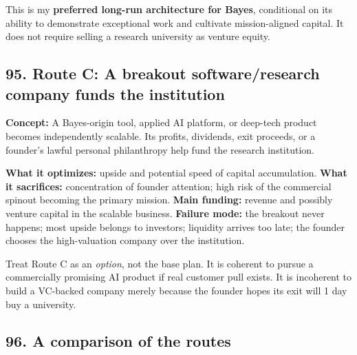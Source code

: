 This is my \textbf{preferred long-run architecture for Bayes}, conditional on its ability to demonstrate exceptional work and cultivate mission-aligned capital. It does not require selling a research university as venture equity.

\subsection{95. Route C: A breakout software/\allowbreak research company funds the institution}

\textbf{Concept:} A Bayes-origin tool, applied AI platform, or deep-tech product becomes independently scalable. Its profits, dividends, exit proceeds, or a founder's lawful personal philanthropy help fund the research institution.

\textbf{What it optimizes:} upside and potential speed of capital accumulation.
\textbf{What it sacrifices:} concentration of founder attention; high risk of the commercial spinout becoming the primary mission.
\textbf{Main funding:} revenue and possibly venture capital in the scalable business.
\textbf{Failure mode:} the breakout never happens; most upside belongs to investors; liquidity arrives too late; the founder chooses the high-valuation company over the institution.

Treat Route C as an \textit{option}, not the base plan. It is coherent to pursue a commercially promising AI product if real customer pull exists. It is incoherent to build a VC-backed company merely because the founder hopes its exit will 1 day buy a university.

\subsection{96. A comparison of the routes}

